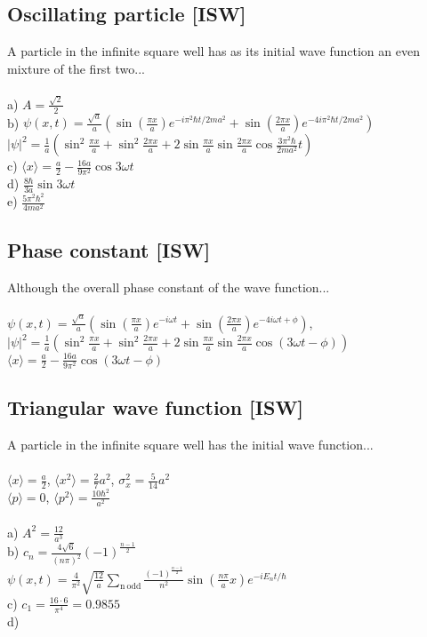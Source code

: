 \documentclass{article}
\newcommand{\<}{\langle}
\renewcommand{\>}{\rangle}
\begin{document}
\subsection{Oscillating particle [ISW]}
A particle in the infinite square well has as its initial wave function an even mixture of the first two...
\\ \\
a) $A = \frac{\sqrt 2}{2}$ \\
b) $\psi(x,t) = \frac{\sqrt a}{a} \left(\sin(\frac{\pi x}{a}) e^{-i\pi^2\hbar t/ 2ma^2} + \sin(\frac{2\pi x}{a})e^{-4i\pi^2\hbar t / 2ma^2}\right)$ \\
$|\psi|^2 = \frac{1}{a} \left( \sin^2\frac{\pi x}{a} + \sin^2\frac{2\pi x}{a} + 2\sin\frac{\pi x}{a}\sin\frac{2\pi x}{a}\cos\frac{3\pi^2\hbar}{2ma^2}t  \right)$ \\
c) $\<x\> = \frac{a}{2} - \frac{16a}{9\pi^2} \cos 3\omega t$ \\
d) $\frac{8\hbar}{3a} \sin 3\omega t$ \\
e) $\frac{5\pi^2\hbar^2}{4ma^2}$
\subsection{Phase constant [ISW]}
Although the overall phase constant of the wave function...
\\ \\
$\psi(x,t) = \frac{\sqrt a}{a} \left(\sin(\frac{\pi x}{a}) e^{-i\omega t} + \sin(\frac{2\pi x}{a})e^{-4i\omega t + \phi}\right)$, \\
$|\psi|^2 = \frac{1}{a} \left( \sin^2\frac{\pi x}{a} + \sin^2\frac{2\pi x}{a} + 2\sin\frac{\pi x}{a}\sin\frac{2\pi x}{a}\cos(3 \omega t - \phi)\right)$ \\
$\<x\> = \frac{a}{2} - \frac{16a}{9\pi^2} \cos(3\omega t - \phi)$ \\

\subsection{Triangular wave function [ISW]}
A particle in the infinite square well has the initial wave function...
\\ \\
$\<x\> = \frac{a}{2}$, 
$\<x^2\> = \frac{2}{7} a^2$,
$\sigma_x^2 = \frac{5}{14} a^2$ \\
$\<p\> = 0$, 
$\<p^2\> = \frac{10 \hbar^2}{a^2}$ \\ 
\\
a) $A^2 = \frac{12}{a^3}$ \\
b) $c_n = \frac{4\sqrt{6}}{(n\pi)^2}(-1)^{\frac{n-1}{2}}$ \\
$\psi(x,t) = \frac{4}{\pi^2} \sqrt{\frac{12}{a}} \sum_{\mathrm{n\ odd}} \frac{(-1)^{\frac{n-1}{2}}}{n^2} \sin(\frac{n\pi}{a} x) e^{-iE_nt/\hbar}$ \\
c) $c_1 = \frac{16 \cdot 6}{\pi^4} = 0.9855$ \\
d)
\end{document}
